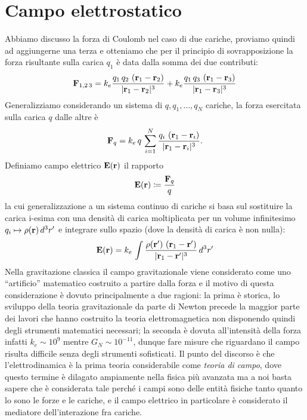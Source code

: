 \section{Campo elettrostatico}
Abbiamo discusso la forza di Coulomb nel caso di due cariche, proviamo quindi ad aggiungerne una terza e otteniamo che per il principio di 
sovrapposizione la forza risultante sulla carica $ q_1 $ è data dalla somma dei due contributi:
\begin{align}
  \mathbf{F}_{1, 2\,3} = k_e \frac{q_1 \, q_2 \, \left( \mathbf{r}_1 - \mathbf{r}_2 \right)}{|\mathbf{r}_1 - \mathbf{r}_2|^3} + 
  k_e \frac{q_1 \, q_3 \, \left( \mathbf{r}_1 - \mathbf{r}_3 \right)}{|\mathbf{r}_1 - \mathbf{r}_3|^3}
\end{align}
Generalizziamo considerando un sistema di $ q,q_1,\dots,q_N $ cariche, la forza esercitata sulla carica $ q $ dalle altre è
\begin{align}
  \mathbf{F}_q = k_e \, q\, \sum_{i = 1}^N  \frac{q_i \, \left( \mathbf{r}_1 - \mathbf{r}_i \right)}{|\mathbf{r}_1 - \mathbf{r}_i|^3}.
\end{align}
Definiamo campo elettrico $ \mathbf{E(r)} $ il rapporto
\begin{align}
  \mathbf{E(r)} \coloneq \frac{\mathbf{F}_q}{q}
\end{align}
la cui generalizzazione a un sistema continuo di cariche si basa sul sostituire la carica i-esima con una densità di carica moltiplicata per un volume 
infinitesimo $ q_i \mapsto \rho(\mathbf{r}) \,d^3r' $ e integrare sullo spazio (dove la densità di carica è non nulla):
\begin{align}
  \mathbf{E(r)} = k_e\, \int \frac{\rho(\mathbf{r'}) \, \left( \mathbf{r}_1 - \mathbf{r'} \right)}{|\mathbf{r}_1 - \mathbf{r'}|^3} \,d^3r'
\end{align}
Nella gravitazione classica il campo gravitazionale viene considerato come uno ``artificio'' matematico costruito a partire dalla forza e il motivo 
di questa considerazione è dovuto principalmente a due ragioni: la prima è storica, lo sviluppo della teoria gravitazionale da parte di Newton precede 
la maggior parte dei lavori che hanno costruito la teoria elettromagnetica non disponendo quindi degli strumenti matematici necessari; la seconda è 
dovuta all'intensità della forza infatti $ k_e \sim 10^9 $ mentre $ G_N \sim 10^{-11} $, dunque fare misure che riguardano il campo risulta difficile senza 
degli strumenti sofisticati. Il punto del discorso è che l'elettrodinamica è la prima teoria considerabile come \textit{teoria di campo}, dove questo 
termine è dilagato ampiamente nella fisica più avanzata ma a noi basta sapere che è considerata tale perché i campi sono delle entità fisiche tanto quanto 
lo sono le forze e le cariche, e il campo elettrico in particolare è considerato il mediatore dell'interazione fra cariche.

